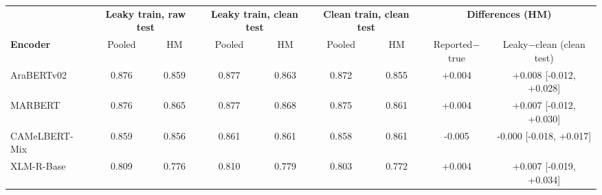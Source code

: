 \begin{tabular}{lcc|cc|cc|cc}
\toprule
 & \multicolumn{2}{c|}{\textbf{Leaky train, raw test}} & \multicolumn{2}{c|}{\textbf{Leaky train, clean test}} & \multicolumn{2}{c|}{\textbf{Clean train, clean test}} & \multicolumn{2}{c}{\textbf{Differences (HM)}} \\
\textbf{Encoder} & Pooled & HM & Pooled & HM & Pooled & HM & Reported$-$true & Leaky$-$clean (clean test) \\
\midrule
AraBERTv02 & 0.876 & 0.859 & 0.877 & 0.863 & 0.872 & 0.855 & +0.004 & +0.008 {\scriptsize[-0.012, +0.028]} \\
MARBERT & 0.876 & 0.865 & 0.877 & 0.868 & 0.875 & 0.861 & +0.004 & +0.007 {\scriptsize[-0.012, +0.030]} \\
CAMeLBERT-Mix & 0.859 & 0.856 & 0.861 & 0.861 & 0.858 & 0.861 & -0.005 & -0.000 {\scriptsize[-0.018, +0.017]} \\
XLM-R-Base & 0.809 & 0.776 & 0.810 & 0.779 & 0.803 & 0.772 & +0.004 & +0.007 {\scriptsize[-0.019, +0.034]} \\
\bottomrule
\end{tabular}
